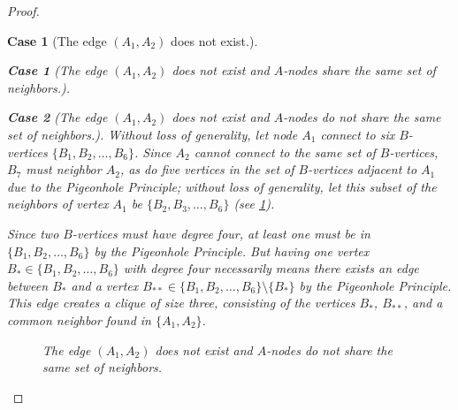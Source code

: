 \documentclass{article}
\newtheorem{case}{Case}
\newtheorem{subcase}{Case}
\numberwithin{subcase}{case}
\begin{document}
\begin{proof}
\begin{case}[The edge $(A_{1}, A_{2})$ does not exist.]
\begin{subcase}[The edge $(A_{1}, A_{2})$ does not exist and $A$-nodes share the same set of neighbors.]
\end{subcase}

\begin{subcase}[The edge $(A_{1}, A_{2})$ does not exist and $A$-nodes do not share the same set of neighbors.]

Without loss of generality, let node $A_{1}$ connect to six $B$-vertices $\lbrace B_{1}, B_{2}, \ldots, B_{6}\rbrace$. Since $A_{2}$ cannot connect to the same set of $B$-vertices, $B_{7}$ must neighbor $A_{2}$, as do  five vertices in the set of $B$-vertices adjacent to $A_{1}$ due to the Pigeonhole Principle; without loss of generality, let this subset of the neighbors of vertex $A_{1}$ be $\lbrace B_{2}, B_{3}, \ldots, B_{6}\rbrace$ (see \cref{fig:case_22}).

Since two $B$-vertices must have degree four, at least one must be in $\lbrace B_{1}, B_{2}, \ldots, B_{6} \rbrace$ by the Pigeonhole Principle. But having one vertex $B_{*} \in \lbrace B_{1}, B_{2}, \ldots, B_{6} \rbrace$ with degree four necessarily means there exists an edge between $B_{*}$ and a vertex $B_{**} \in \lbrace B_{1}, B_{2}, \ldots, B_{6} \rbrace \setminus \lbrace B_{*} \rbrace$ by the Pigeonhole Principle. This edge creates a clique of size three, consisting of the vertices $B_{*}$, $B_{**}$, and a common neighbor found in $\lbrace A_{1}, A_{2} \rbrace$.


    \begin{figure}[H]
        \centering
    \caption{The edge $(A_{1}, A_{2})$ does not exist and $A$-nodes do not share the same set of neighbors.}
    \label{fig:case_22}
    \end{figure}
    

\end{subcase}
\end{case}
\end{proof}
\end{document}
